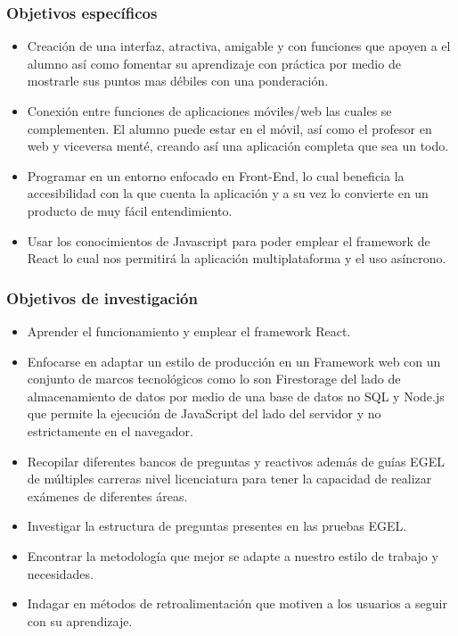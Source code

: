 \documentclass[12pt]{book}
\begin{document}
	\subsubsection{Objetivos específicos}
	{\normalsize \begin{itemize}
			\item Creación de una interfaz, atractiva, amigable y con funciones que apoyen a el alumno así como fomentar su aprendizaje con práctica por medio de mostrarle sus puntos mas débiles con una ponderación. 
			\item Conexión entre funciones de aplicaciones móviles/web las cuales se complementen. El alumno puede estar en el móvil, así como el profesor en web y viceversa menté, creando así una aplicación completa que sea un todo. 
			\item Programar en un entorno enfocado en Front-End, lo cual beneficia la accesibilidad con la que cuenta la aplicación y a su vez lo convierte en un producto de muy fácil entendimiento. 
			\item Usar los conocimientos de Javascript para poder emplear el framework de React lo cual nos permitirá la aplicación multiplataforma y el uso asíncrono.
     \end{itemize}}

        \subsubsection{Objetivos de investigación} 
        {\normalsize \begin{itemize}
            \item Aprender el funcionamiento y emplear el framework React. 
            \item Enfocarse en adaptar un estilo de producción en un Framework web con un conjunto de marcos tecnológicos como lo son Firestorage del lado de almacenamiento de datos por medio de una base de datos no SQL y Node.js que permite la ejecución de JavaScript del lado del servidor y no estrictamente en el navegador. 
            \item Recopilar diferentes bancos de preguntas y reactivos además de guías EGEL de múltiples carreras nivel licenciatura para tener la capacidad de realizar exámenes de diferentes áreas. 
            \item Investigar la estructura de preguntas presentes en las pruebas EGEL.
            \item Encontrar la metodología que mejor se adapte a nuestro estilo de trabajo y necesidades. 
            \item Indagar en métodos de retroalimentación que motiven a los usuarios a seguir con su aprendizaje. 
        \end{itemize}}
        
\end{document}
